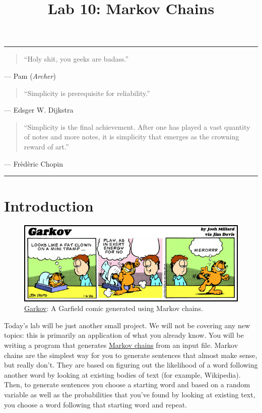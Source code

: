 \documentclass[11pt]{cselabheader}
\title{Lab 10: Markov Chains}
\begin{document}
\maketitle

\hrule
\begin{quotation}
``Holy shit, you geeks are badass.''
\end{quotation}
\begin{flushright}
  --- Pam (\emph{Archer})
\end{flushright}


\begin{quotation}
``Simplicity is prerequisite for reliability.''
\end{quotation}
\begin{flushright}
--- Edsger W. Dijkstra
\end{flushright}

\begin{quotation}
``Simplicity is the final achievement. After one has played a vast quantity of
notes and more notes, it is simplicity that emerges as the crowning reward of
art.''
\end{quotation}
\begin{flushright}
--- Fr\`ed\`eric Chopin
\end{flushright}

\hrule

\section{Introduction}

\begin{figure}
  \centering
  \includegraphics[width=\linewidth]{img/garkov}
  \caption{\href{http://joshmillard.com/garkov/}{Garkov}:
    A Garfield comic generated using Markov chains.}
  \label{garkov}
\end{figure}

Today's lab will be just another small project.
We will not be covering any new
topics: this is primarily an application of what you already know. You will be
writing a program that generates
\href{http://en.wikipedia.org/wiki/Markov_chain}{Markov chains} from an input
file. Markov chains are the simplest way for you to generate sentences that
almost make sense, but really don't. They are based on figuring out the
likelihood of a word following another word by looking at existing bodies of
text (for example, Wikipedia). Then, to generate sentences you choose a starting
word and based on a random variable as well as the probabilities that you've
found by looking at existing text, you choose a word following that starting
word and repeat. 
\end{document}
